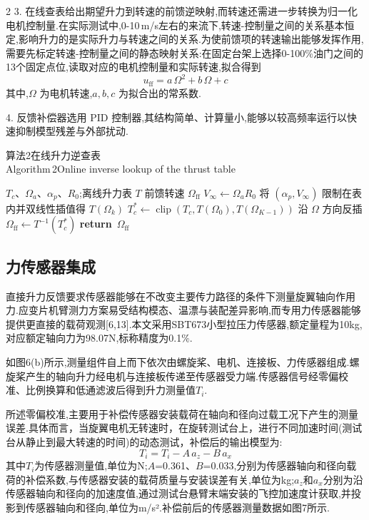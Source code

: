 \documentclass{aas}
\begin{document}
\begin{multicols}{2}
3. 在线查表给出期望升力到转速的前馈逆映射,而转速还需进一步转换为归一化电机控制量.在实际测试中,0-10\,m/s左右的来流下,转速-控制量之间的关系基本恒定,影响升力的是实际升力与转速之间的关系.为使前馈项的转速输出能够发挥作用,需要先标定转速-控制量之间的静态映射关系:在固定台架上选择0-100\%油门之间的13个固定点位,读取对应的电机控制量和实际转速,拟合得到
\begin{equation}
u_{\mathrm{ff}}=a\,\Omega^2+b\,\Omega+c
\label{eq:rpm_calib}
\end{equation}
其中,$\Omega$ 为电机转速,$a,b,c$ 为拟合出的常系数.

4. 反馈补偿器选用 PID 控制器,其结构简单、计算量小,能够以较高频率运行以快速抑制模型残差与外部扰动.
\begin{center}
\begin{minipage}{0.98\columnwidth}
\centering
{\small 算法2\quad 在线升力逆查表
\\
Algorithm\,2\quad Online inverse lookup of the thrust table}
\vskip2mm
\footnotesize
\begin{algorithmic}[1]
\Require $T_c$、$\Omega_a$、$\alpha_p$、$R_0$;离线升力表 $T$
\Ensure 前馈转速 $\Omega_{\mathrm{ff}}$
\State $V_\infty\gets\Omega_aR_0$
\State 将 $(\alpha_p,V_\infty)$ 限制在表内并双线性插值得 $T(\Omega_k)$
\State $T_c^*\gets\operatorname{clip}\!\left(T_c,T(\Omega_0),T(\Omega_{K-1})\right)$
\State 沿 $\Omega$ 方向反插 $\Omega_{\mathrm{ff}}\gets T^{-1}(T_c^*)$
\State \textbf{return}\ $\Omega_{\mathrm{ff}}$
\end{algorithmic}
\end{minipage}
\end{center}

\subsection{力传感器集成}
直接升力反馈要求传感器能够在不改变主要传力路径的条件下测量旋翼轴向作用力.应变片机臂测力方案易受结构模态、温漂与装配差异影响,而专用力传感器能够提供更直接的载荷观测[6,13].本文采用SBT673小型拉压力传感器,额定量程为10kg,对应额定轴向力为98.07N,标称精度为0.1$\%$.

如图6(b)所示,测量组件自上而下依次由螺旋桨、电机、连接板、力传感器组成.螺旋桨产生的轴向升力经电机与连接板传递至传感器受力端.传感器信号经零偏校准、比例换算和低通滤波后得到升力测量值$T_i$.

所述零偏校准,主要用于补偿传感器安装载荷在轴向和径向过载工况下产生的测量误差.具体而言，当旋翼电机无转速时，在旋转测试台上，进行不同加速时间(测试台从静止到最大转速的时间)的动态测试，补偿后的输出模型为:
\begin{equation}
T_i=T_i-A\,a_z-B\,a_x
\label{eq:sensor_calib}
\end{equation}
其中$T_i$为传感器测量值,单位为N;$A$=0.361、$B$=0.033,分别为传感器轴向和径向载荷的补偿系数,与传感器安装的载荷质量与安装误差有关,单位为kg;$a_z$和$a_x$分别为沿传感器轴向和径向的加速度值,通过测试台悬臂末端安装的飞控加速度计获取,并投影到传感器轴向和径向,单位为m/s².补偿前后的传感器测量数据如图7所示.


\end{multicols}
\end{document}
